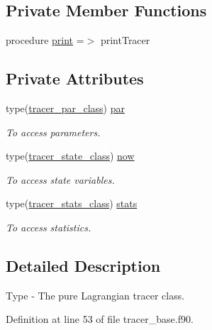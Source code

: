 \subsection*{Private Member Functions}
\begin{DoxyCompactItemize}
\item 
procedure \mbox{\hyperlink{structtracer__base__mod_1_1tracer__class_acacd5bcbddb11eb6756588419bf31ff9}{print}} =$>$ print\+Tracer
\end{DoxyCompactItemize}
\subsection*{Private Attributes}
\begin{DoxyCompactItemize}
\item 
type(\mbox{\hyperlink{structtracer__base__mod_1_1tracer__par__class}{tracer\+\_\+par\+\_\+class}}) \mbox{\hyperlink{structtracer__base__mod_1_1tracer__class_abadf1c607905330dc05f8985f6487a41}{par}}
\begin{DoxyCompactList}\small\item\em To access parameters. \end{DoxyCompactList}\item 
type(\mbox{\hyperlink{structtracer__base__mod_1_1tracer__state__class}{tracer\+\_\+state\+\_\+class}}) \mbox{\hyperlink{structtracer__base__mod_1_1tracer__class_a282d3a68cbf79a87706e0b0bb974dd8f}{now}}
\begin{DoxyCompactList}\small\item\em To access state variables. \end{DoxyCompactList}\item 
type(\mbox{\hyperlink{structtracer__base__mod_1_1tracer__stats__class}{tracer\+\_\+stats\+\_\+class}}) \mbox{\hyperlink{structtracer__base__mod_1_1tracer__class_a688d74f9059a50eba8fdd536c2f79876}{stats}}
\begin{DoxyCompactList}\small\item\em To access statistics. \end{DoxyCompactList}\end{DoxyCompactItemize}


\subsection{Detailed Description}
Type -\/ The pure Lagrangian tracer class. 

Definition at line 53 of file tracer\+\_\+base.\+f90.



